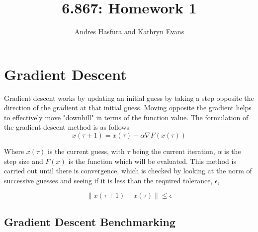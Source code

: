 \documentclass{article}
\begin{document}
\title{6.867: Homework 1}
\author{Andres Hasfura and Kathryn Evans}
\maketitle
\section{Gradient Descent}
Gradient descent works by updating an initial guess by taking a step opposite the direction of the gradient at that initial guess. Moving opposite the gradient helps  to effectively move "downhill" in terms of the function value.  The formulation of the gradient descent method is as follows
\begin{equation}
x(\tau+1) = x(\tau) - \alpha \nabla F(x(\tau))
\end{equation}

Where $ x(\tau)$ is the current guess, with $\tau$ being the current iteration, $\alpha$ is the step size and $F(x)$ is the function which will be evaluated. This method is carried out until there is convergence, which is checked by looking at the norm of successive guesses and seeing if it is less than the required tolerance, $\epsilon$,   


\begin{equation} 
\left \lVert x(\tau+1)-x(\tau) \right \rVert \leq \epsilon
\end{equation}



\subsection*{ Gradient Descent Benchmarking}
\end{document}
